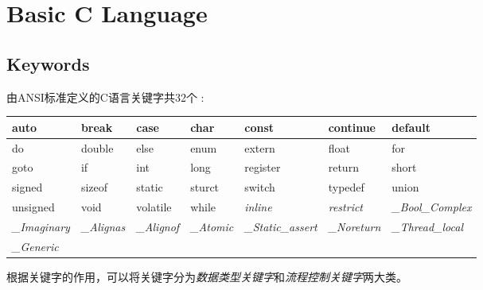 \chapter{Basic C Language}\label{sec:basic_chapter}

\section{Keywords}
由ANSI标准定义的C语言关键字共32个 :

\begin{table}
\begin{tabular}{|l|l|l|l|l|l|l|}
\hline
auto      & break  & case      & char    & const  	   & continue	  & default   \\
\hline
do        & double &  else     & enum    & extern      & float        & for       \\
\hline
goto      & if     & int       & long    & register    &  return      & short     \\
\hline
signed    & sizeof & static    & sturct  & switch      & typedef      & union     \\
\hline
unsigned  & void   & volatile  &  while  & \textit{inline}    & \textit{restrict}     & \textit{_Bool_Complex}   \\
\hline
\textit{_Imaginary} & \textit{_Alignas} & \textit{_Alignof}  & \textit{_Atomic}   & \textit{_Static_assert}  &  \textit{_Noreturn}  & \textit{_Thread_local}     \\
\hline
\textit{_Generic}  & & & & & &  \\
\hline
\end{tabular}
\end{table}

根据关键字的作用，可以将关键字分为\textit{数据类型关键字}和\textit{流程控制关键字}两大类。

